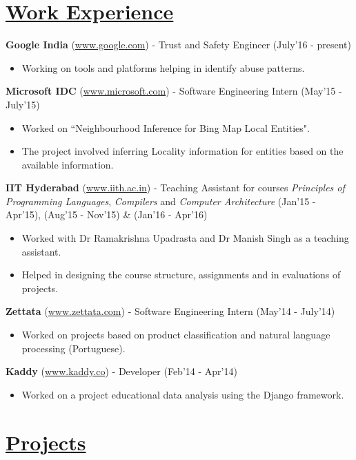 \documentclass[8pt]{extarticle}
\newcommand{\heading}[1]{
\section*{\color{red}\underline{#1}}
}
\begin{document}
\heading{Work Experience}

\textbf{Google India} (\url{www.google.com}) - Trust and Safety Engineer \hfill (July'16 - present)
\begin{itemize}
\item Working on tools and platforms helping in identify abuse patterns.
\end{itemize}
\space
\textbf{Microsoft IDC} (\url{www.microsoft.com}) - Software Engineering Intern \hfill (May'15 - July'15)
\begin{itemize}
\item Worked on ``Neighbourhood Inference for Bing Map Local Entities".
\item The project involved inferring Locality information for entities based on the available information.
\end{itemize}
\space
\textbf{IIT Hyderabad} (\url{www.iith.ac.in}) - Teaching Assistant for courses \textit{Principles of Programming Languages}, \textit{Compilers} and \textit{Computer Architecture} \hfill (Jan'15 - Apr'15), (Aug'15 - Nov'15) \& (Jan'16 - Apr'16)
\begin{itemize}
\item Worked with Dr Ramakrishna Upadrasta and Dr Manish Singh as a teaching assistant.
\item Helped in designing the course structure, assignments and in evaluations of projects.
\end{itemize}
\space
\textbf{Zettata} (\url{www.zettata.com}) - Software Engineering Intern \hfill (May'14 - July'14)
\begin{itemize}
\item Worked on projects based on product classification and natural language processing (Portuguese).
\end{itemize}
\space
\textbf{Kaddy} (\url{www.kaddy.co}) - Developer \hfill (Feb'14 - Apr'14)
\begin{itemize}
\item Worked on a project educational data analysis using the Django framework.
\end{itemize}

\heading{Projects}
\end{document}
